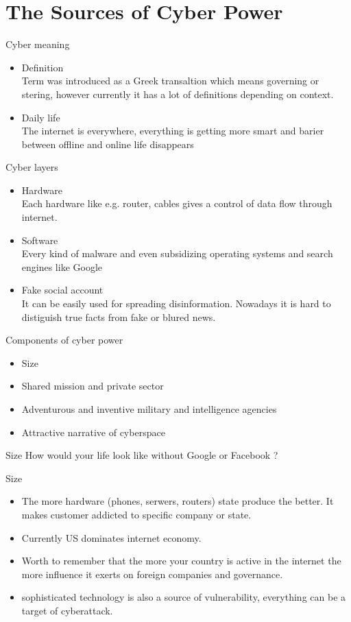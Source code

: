 \documentclass[xcolor=table]{beamer}
\begin{document}
\section{The Sources of Cyber Power}
\begin{frame}{Cyber meaning}
\begin{itemize}
\item Definition\\
Term was introduced as a Greek transaltion which means governing or stering, however currently it has a lot of definitions depending on context.
\item Daily life\\
The internet is everywhere, everything is getting more smart and barier between offline and online life disappears
\end{itemize}
\end{frame}
\begin{frame}{Cyber layers}
\begin{itemize}
\item Hardware\\
Each hardware like e.g. router, cables gives a control of data flow through internet.
\item Software\\
Every kind of malware and even subsidizing operating systems and search engines like Google
\item Fake social account\\
It can be easily used for spreading disinformation. Nowadays it is hard to distiguish true facts from fake or blured news.
\end{itemize}
\end{frame}
\begin{frame}{Components of cyber power}
\begin{itemize}
\item Size
\item Shared mission and private sector
\item Adventurous and inventive military and intelligence agencies
\item Attractive narrative of cyberspace
\end{itemize}
\end{frame}
\begin{frame}{Size}
\Huge{How would your life look like without Google or Facebook ?}
\end{frame}
\begin{frame}{Size}
\begin{itemize}
\item The more hardware (phones, serwers, routers) state produce the better. It makes customer addicted to specific company or state.
\item Currently US dominates internet economy. 
\item Worth to remember that the more your country is active in the internet the more influence it exerts on foreign companies and governance.
\item sophisticated technology is also a source of vulnerability, everything can be a target of cyberattack.
\end{itemize}
\end{frame}
\end{document}
